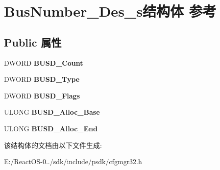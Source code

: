 \hypertarget{struct_bus_number___des__s}{}\section{Bus\+Number\+\_\+\+Des\+\_\+s结构体 参考}
\label{struct_bus_number___des__s}
\subsection*{Public 属性}
\begin{DoxyCompactItemize}
\item 
\mbox{\label{struct_bus_number___des__s_ada312f28af4495efe0ba9b8ca4b69860}} 
D\+W\+O\+RD {\bfseries B\+U\+S\+D\+\_\+\+Count}
\item 
\mbox{\label{struct_bus_number___des__s_a87c09aabd744f64da6ba5c59f8c06a66}} 
D\+W\+O\+RD {\bfseries B\+U\+S\+D\+\_\+\+Type}
\item 
\mbox{\label{struct_bus_number___des__s_ab6d7a60adf58d7da6a1022f2f4f55e7e}} 
D\+W\+O\+RD {\bfseries B\+U\+S\+D\+\_\+\+Flags}
\item 
\mbox{\label{struct_bus_number___des__s_a34a347e7a7da5de5b620602159a3eb20}} 
U\+L\+O\+NG {\bfseries B\+U\+S\+D\+\_\+\+Alloc\+\_\+\+Base}
\item 
\mbox{\label{struct_bus_number___des__s_ad5834aaa8d2a51bd59c3ccd8ce07471c}} 
U\+L\+O\+NG {\bfseries B\+U\+S\+D\+\_\+\+Alloc\+\_\+\+End}
\end{DoxyCompactItemize}


该结构体的文档由以下文件生成\+:\begin{DoxyCompactItemize}
\item 
E\+:/\+React\+O\+S-\/0../sdk/include/psdk/cfgmgr32.\+h\end{DoxyCompactItemize}
